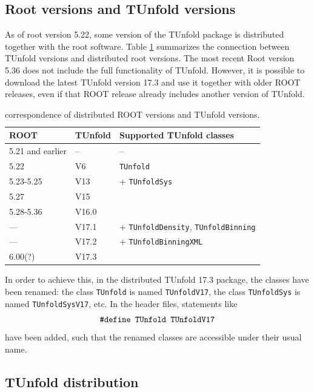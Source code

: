 \documentclass[12pt]{article}
\newcommand{\tunfoldmajor}{17}
\newcommand{\tunfoldminor}{3}
\newcommand{\tunfoldversion}{{\tunfoldmajor{}.\tunfoldminor}}
\begin{document}
\subsection{Root versions and TUnfold versions}

As of root version 5.22, some version of the TUnfold package is
distributed together with the root software. Table
\ref{tab:rootversion} summarizes the connection between TUnfold
versions and distributed root versions.
The most recent Root version 5.36 does not include the full
functionality of TUnfold.
However, it is possible to download the latest TUnfold version
\tunfoldversion{} and use
it together with older ROOT releases, even if that ROOT release
already includes another version of TUnfold.
\begin{table}[h]
\centering
\begin{tabular}{l|l|l}
ROOT & TUnfold & Supported TUnfold classes \\
\hline
5.21 and earlier & -- & -- \\
5.22 & V6 & {\tt TUnfold} \\
5.23-5.25 & V13 & + {\tt TUnfoldSys} \\
5.27 & V15 & \\ %
5.28-5.36 & V16.0 & \\%
---  & V17.1 & + {\tt TUnfoldDensity}, {\tt TUnfoldBinning} \\
--- & V17.2 & + {\tt TUnfoldBinningXML}\\
6.00(?) & V\tunfoldversion & \\
\hline
\end{tabular}
\caption{\label{tab:rootversion}correspondence of distributed ROOT versions and TUnfold versions.}
\end{table}
In order to achieve this, in the distributed TUnfold \tunfoldversion{}
package, the classes have been renamed: 
the class {\tt TUnfold} is named {\tt TUnfoldV\tunfoldmajor}, the
class {\tt TUnfoldSys} is named {\tt TUnfoldSysV\tunfoldmajor},
etc. In the header files, statements like
%
\begin{equation*}
\text{\tt \#define TUnfold TUnfoldV\tunfoldmajor}
\end{equation*}
%
have been added, such that the renamed classes are accessible under
their usual name.

\subsection{TUnfold distribution}
\end{document}
